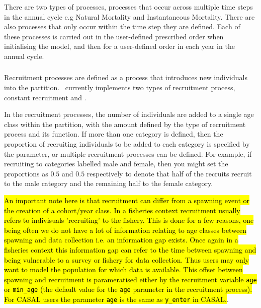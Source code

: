 There are two types of processes, processes that occur across multiple time steps in the annual cycle e.g Natural Mortality and Instantaneous Mortality. There are also processes that only occur within the time step they are defined. Each of these processes is carried out in the user-defined prescribed order when initialising the model, and then for a user-defined order in each year in the annual cycle. 

\subsubsection{}

Recruitment processes are defined as a process that introduces new individuals into the partition. \CNAME\ currently implements two types of recruitment process, constant recruitment and   \citep{1203}.

In the recruitment processes, the number of individuals are added to a single age class within the partition, with the amount defined by the type of recruitment process and its function. If more than one category is defined, then the proportion of recruiting individuals to be added to each category is specified by the  parameter, or multiple recruitment processes can be defined. For example, if recruiting to categories labelled male and female, then you might set the proportions as $0.5$ and $0.5$ respectively to denote that half of the recruits recruit to the male category and the remaining half to the female category. 

\hl{An important note here is that recruitment can differ from a spawning event or the creation of a cohort/year class. In a fisheries context recruitment usually refers to indivisuals 'recruiting' to the fishery. This is done for a few reasons, one being often we do not have a lot of information relating to age classes between spawning and data collection i.e. an information gap exists. Once again in a fisheries context this information gap can refer to the time between spawning and being vulnerable to a survey or fishery for data collection. Thus users may only want to model the population for which data is available. This offset between spawning and recruitment is parameratised either by the recruitment variable \texttt{age} or \texttt{min\_age} (the default value for the \texttt{age} parameter in the recruitment process). For CASAL users the parameter \texttt{age} is the same as \texttt{y\_enter} in CASAL.}. 

